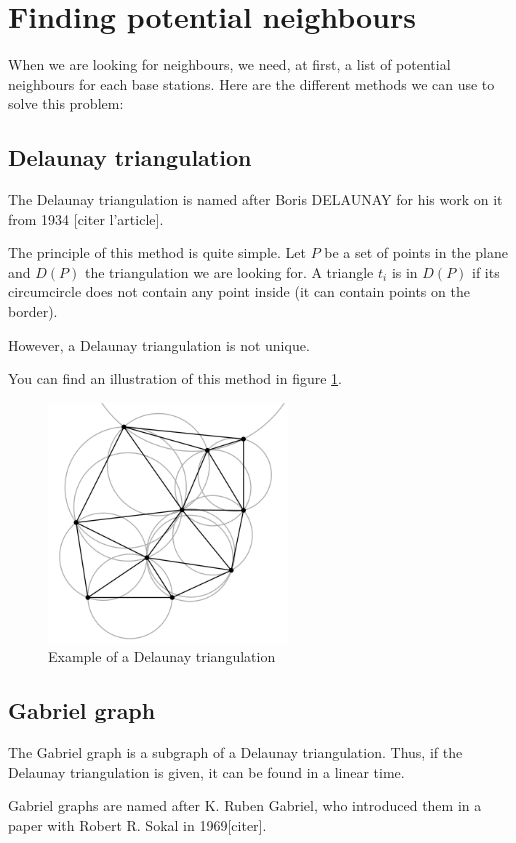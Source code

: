 \documentclass[lettersize,journal]{IEEEtran}
\begin{document}
\section{Finding potential neighbours}
\noindent When we are looking for neighbours, we need, at first, a list of potential neighbours for each base stations.
Here are the different methods we can use to solve this problem:

\subsection{Delaunay triangulation}
\noindent The Delaunay triangulation is named after Boris DELAUNAY for his work on it from 1934 [citer l'article].

The principle of this method is quite simple. Let $P$ be a set of points in the plane and $D(P)$ the triangulation we are looking for.
A triangle $t_i$ is in $D(P)$ if its circumcircle does not contain any point inside (it can contain points on the border).

However, a Delaunay triangulation is not unique.

You can find an illustration of this method in figure \ref{del_tri}.
\begin{figure}[!t]
    \centering
    \includegraphics[width=2.5in]{images/illus_graphs/Delaunay_circumcircles_vectorial.svg.png}
    \caption{Example of a Delaunay triangulation}
    \label{del_tri}
\end{figure}

\subsection{Gabriel graph}
\noindent The Gabriel graph is a subgraph of a Delaunay triangulation. Thus, if the Delaunay triangulation is given, it can be found in a linear time. 

Gabriel graphs are named after K. Ruben Gabriel, who introduced them in a paper with Robert R. Sokal in 1969[citer].
\end{document}
